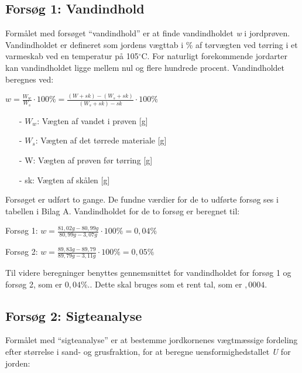\subsection{Forsøg 1: Vandindhold}
Formålet med forsøget “vandindhold” er at finde vandindholdet \textit{w} i jordprøven. Vandindholdet er defineret som jordens vægttab i \% af tørvægten ved tørring i et varmeskab ved en temperatur på 105$^{\circ}$C. For naturligt forekommende jordarter kan vandindholdet ligge mellem nul og flere hundrede procent.
\newline
\newline
Vandindholdet beregnes ved:

\begin{center}
	$w = \frac{W_w}{W_s}\cdot 100\% = \frac{(W+sk)-(W_s+sk)}{(W_s+sk)-sk}\cdot 100\%$
\end{center}

\begin{itemize}
	\item[-] $W_w$: Vægten af vandet i prøven [g]
	\item[-] $W_s$: Vægten af det tørrede materiale [g]
	\item[-] W: Vægten af prøven før tørring [g]
	\item[-] sk: Vægten af skålen [g]
\end{itemize}

Forsøget er udført to gange. De fundne værdier for de to udførte forsøg ses i tabellen i Bilag A. Vandindholdet for de to forsøg er beregnet til:

\begin{center}
	Forsøg 1: $w = \frac{81,\!02 g - 80,\!99 g}{80,\!99 g - 3,\!07 g}\cdot 100\% = 0,\!04\%$
\end{center}

\begin{center}
	Forsøg 2: $w = \frac{89,\!83 g - 89,\!79}{89,\!79 g - 3,\!11 g}\cdot 100\% = 0,\!05\%$
\end{center}

Til videre beregninger benyttes gennemsnittet for vandindholdet for forsøg 1 og forsøg 2, som er $0,\!04$\%.. Dette skal bruges som et rent tal, som er $,\!0004$. 

\subsection{Forsøg 2: Sigteanalyse}
Formålet med “sigteanalyse” er at bestemme jordkornenes vægtmæssige fordeling efter størrelse i sand- og grusfraktion, for at beregne uensformighedstallet \textit{U} for jorden:

